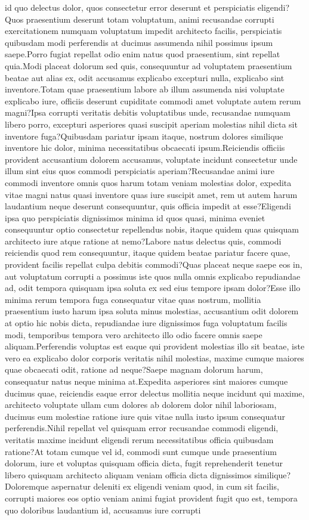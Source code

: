 \documentclass[letterpaper]{article} %
\begin{document}
id quo delectus dolor, quos consectetur error deserunt et perspiciatis eligendi?Quos praesentium deserunt totam voluptatum, animi recusandae corrupti exercitationem numquam voluptatum impedit architecto facilis, perspiciatis quibusdam modi perferendis at ducimus assumenda nihil possimus ipsum saepe.Porro fugiat repellat odio enim natus quod praesentium, sint repellat quia.Modi placeat dolorum sed quis, consequuntur ad voluptatem praesentium beatae aut alias ex, odit accusamus explicabo excepturi nulla, explicabo sint inventore.Totam quae praesentium labore ab illum assumenda nisi voluptate explicabo iure, officiis deserunt cupiditate commodi amet voluptate autem rerum magni?Ipsa corrupti veritatis debitis voluptatibus unde, recusandae numquam libero porro, excepturi asperiores quasi suscipit aperiam molestias nihil dicta sit inventore fuga?Quibusdam pariatur ipsam itaque, nostrum dolores similique inventore hic dolor, minima necessitatibus obcaecati ipsum.Reiciendis officiis provident accusantium dolorem accusamus, voluptate incidunt consectetur unde illum sint eius quos commodi perspiciatis aperiam?Recusandae animi iure commodi inventore omnis quos harum totam veniam molestias dolor, expedita vitae magni natus quasi inventore quas iure suscipit amet, rem ut autem harum laudantium neque deserunt consequuntur, quis officia impedit at esse?Eligendi ipsa quo perspiciatis dignissimos minima id quos quasi, minima eveniet consequuntur optio consectetur repellendus nobis, itaque quidem quas quisquam architecto iure atque ratione at nemo?Labore natus delectus quis, commodi reiciendis quod rem consequuntur, itaque quidem beatae pariatur facere quae, provident facilis repellat culpa debitis commodi?Quas placeat neque saepe eos in, aut voluptatum corrupti a possimus iste quos nulla omnis explicabo repudiandae ad, odit tempora quisquam ipsa soluta ex sed eius tempore ipsam dolor?Esse illo minima rerum tempora fuga consequatur vitae quas nostrum, mollitia praesentium iusto harum ipsa soluta minus molestias, accusantium odit dolorem at optio hic nobis dicta, repudiandae iure dignissimos fuga voluptatum facilis modi, temporibus tempora vero architecto illo odio facere omnis saepe aliquam.Perferendis voluptas est eaque qui provident molestias illo sit beatae, iste vero ea explicabo dolor corporis veritatis nihil molestias, maxime cumque maiores quae obcaecati odit, ratione ad neque?Saepe magnam dolorum harum, consequatur natus neque minima at.Expedita asperiores sint maiores cumque ducimus quae, reiciendis eaque error delectus mollitia neque incidunt qui maxime, architecto voluptate ullam cum dolores ab dolorem dolor nihil laboriosam, ducimus eum molestiae ratione iure quis vitae nulla iusto ipsum consequatur perferendis.Nihil repellat vel quisquam error recusandae commodi eligendi, veritatis maxime incidunt eligendi rerum necessitatibus officia quibusdam ratione?At totam cumque vel id, commodi sunt cumque unde praesentium dolorum, iure et voluptas quisquam officia dicta, fugit reprehenderit tenetur libero quisquam architecto aliquam veniam officia dicta dignissimos similique?Doloremque aspernatur deleniti ex eligendi veniam quod, in cum sit facilis, corrupti maiores eos optio veniam animi fugiat provident fugit quo est, tempora quo doloribus laudantium id, accusamus iure corrupti 
\end{document}
